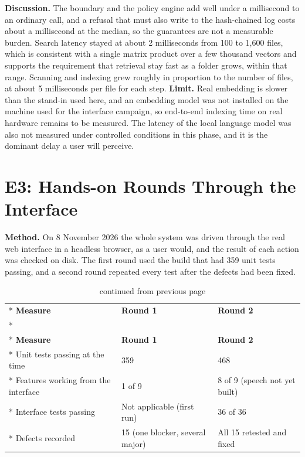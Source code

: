 \documentclass{FastFyp}
\begin{document}
\textbf{Discussion.} The boundary and the policy engine add well under a millisecond to an ordinary call, and a refusal that must also write to the hash-chained log costs about a millisecond at the median, so the guarantees are not a measurable burden. Search latency stayed at about 2 milliseconds from 100 to 1,600 files, which is consistent with a single matrix product over a few thousand vectors and supports the requirement that retrieval stay fast as a folder grows, within that range. Scanning and indexing grew roughly in proportion to the number of files, at about 5 milliseconds per file for each step. \textbf{Limit.} Real embedding is slower than the stand-in used here, and an embedding model was not installed on the machine used for the interface campaign, so end-to-end indexing time on real hardware remains to be measured. The latency of the local language model was also not measured under controlled conditions in this phase, and it is the dominant delay a user will perceive.

\section{E3: Hands-on Rounds Through the Interface}
\textbf{Method.} On 8 November 2026 the whole system was driven through the real web interface in a headless browser, as a user would, and the result of each action was checked on disk. The first round used the build that had 359 unit tests passing, and a second round repeated every test after the defects had been fixed.

{
\begin{longtable}{|p{5.3cm}|p{3.7cm}|p{3.7cm}|}
\caption{Results of the two hands-on rounds.}\label{tab:rounds}\\*
\hline
\textbf{Measure} & \textbf{Round 1} & \textbf{Round 2} \\*
\hline
\endfirsthead
\caption[]{continued from previous page}\\*
\hline
\textbf{Measure} & \textbf{Round 1} & \textbf{Round 2} \\*
\hline
\endhead
\hline
Unit tests passing at the time & 359 & 468 \\*
\hline
Features working from the interface & 1 of 9 & 8 of 9 (speech not yet built) \\*
\hline
Interface tests passing & Not applicable (first run) & 36 of 36 \\*
\hline
Defects recorded & 15 (one blocker, several major) & All 15 retested and fixed \\
\hline
\end{longtable}
}
\end{document}
